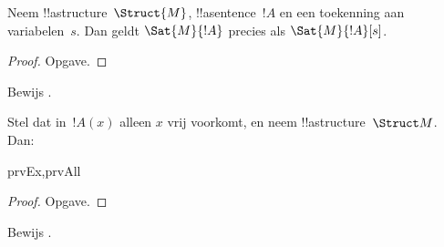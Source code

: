 \documentclass[openany]{memoir}
\begin{document}
\begin{prop}
  Neem !!a{structure}~$\Struct{M}$, !!a{sentence}~$!A$ en een
  toekenning aan variabelen~$s$. Dan geldt $\Sat{M}{!A}$ precies als
  $\Sat{M}{!A}[s]$.
\end{prop}

\begin{proof}
Opgave.
\end{proof}

\begin{prob}
Bewijs .
\end{prob}

\begin{prop}
  Stel dat in~$!A(x)$ alleen $x$ vrij voorkomt, en neem
  !!a{structure}~$\Struct M$. Dan:
  \begin{tagenumerate}{prvEx,prvAll}
\end{tagenumerate}
\end{prop}

\begin{proof}
Opgave.
\end{proof}

\begin{prob}
Bewijs .
\end{prob}
\end{document}
